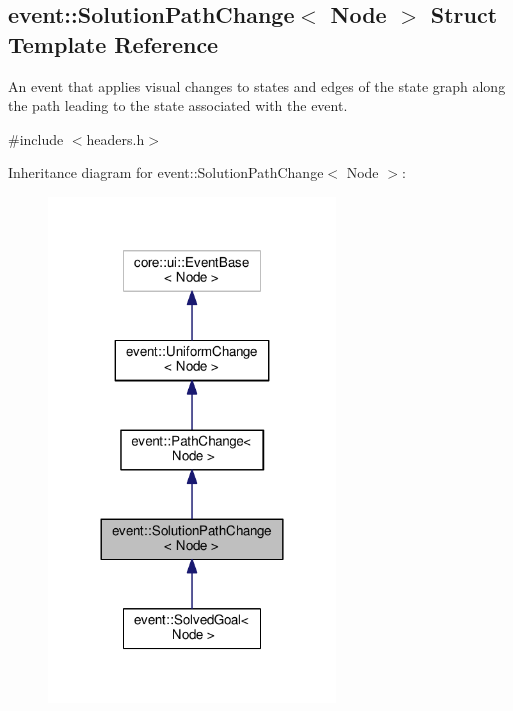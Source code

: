 \hypertarget{structevent_1_1SolutionPathChange}{}\subsection{event\+:\+:Solution\+Path\+Change$<$ Node $>$ Struct Template Reference}
\label{structevent_1_1SolutionPathChange}


An event that applies visual changes to states and edges of the state graph along the path leading to the state associated with the event.  




{\ttfamily \#include $<$headers.\+h$>$}



Inheritance diagram for event\+:\+:Solution\+Path\+Change$<$ Node $>$\+:\nopagebreak
\begin{figure}[H]
\begin{center}
\leavevmode
\includegraphics[width=216pt]{structevent_1_1SolutionPathChange__inherit__graph}
\end{center}
\end{figure}


